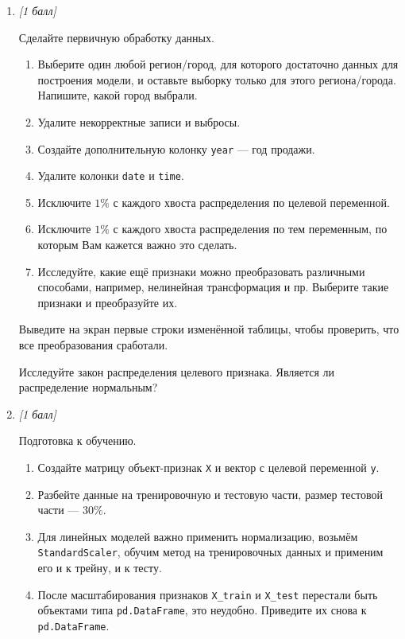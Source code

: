 \begin{enumerate}[label=\textbf{Task \arabic*:}, leftmargin=*]

\item \textit{[1 балл]}

Сделайте первичную обработку данных.

\begin{enumerate}[label=\arabic*)]
    \item Выберите один любой регион/город, для которого достаточно данных для построения модели, и оставьте выборку только для этого региона/города. Напишите, какой город выбрали.
    \item Удалите некорректные записи и выбросы.
    \item Создайте дополнительную колонку \texttt{year} --- год продажи.
    \item Удалите колонки \texttt{date} и \texttt{time}.
    \item Исключите \(1\%\) с каждого хвоста распределения по целевой переменной.
    \item Исключите \(1\%\) с каждого хвоста распределения по тем переменным, по которым Вам кажется важно это сделать.
    \item Исследуйте, какие ещё признаки можно преобразовать различными способами, например, нелинейная трансформация и пр. Выберите такие признаки и преобразуйте их.
\end{enumerate}

Выведите на экран первые строки изменённой таблицы, чтобы проверить, что все преобразования сработали.

Исследуйте закон распределения целевого признака. Является ли распределение нормальным?

\item \textit{[1 балл]}

Подготовка к обучению.

\begin{enumerate}[label=\arabic*)]
    \item Создайте матрицу объект-признак \texttt{X} и вектор с целевой переменной \texttt{y}.
    \item Разбейте данные на тренировочную и тестовую части, размер тестовой части --- \(30\%\).
    \item Для линейных моделей важно применить нормализацию, возьмём \texttt{StandardScaler}, обучим метод на тренировочных данных и применим его и к трейну, и к тесту.
    \item После масштабирования признаков \texttt{X\_train} и \texttt{X\_test} перестали быть объектами типа \texttt{pd.DataFrame}, это неудобно. Приведите их снова к \texttt{pd.DataFrame}.
\end{enumerate}


\end{enumerate}
